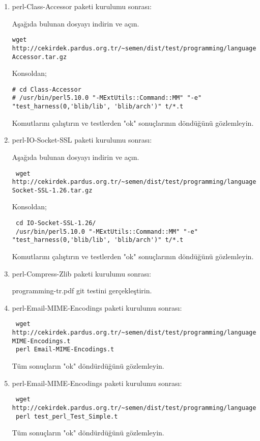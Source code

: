 \documentclass[a4paper,10pt]{article}
\begin{document}
\begin{enumerate}
\item perl-Class-Accessor paketi kurulumu sonrası:

Aşağıda bulunan dosyayı indirin ve açın.
\begin{verbatim}
wget http://cekirdek.pardus.org.tr/~semen/dist/test/programming/language/perl/Class-Accessor.tar.gz
\end{verbatim}

Konsoldan;
\begin{verbatim}
# cd Class-Accessor
# /usr/bin/perl5.10.0 "-MExtUtils::Command::MM" "-e" "test_harness(0,'blib/lib', 'blib/arch')" t/*.t
\end{verbatim}

Komutlarını çalıştırın ve testlerden "ok" sonuçlarının döndüğünü gözlemleyin.


\item perl-IO-Socket-SSL paketi kurulumu sonrası:

Aşağıda bulunan dosyayı indirin ve açın.
\begin{verbatim}
 wget http://cekirdek.pardus.org.tr/~semen/dist/test/programming/language/perl/IO-Socket-SSL-1.26.tar.gz
\end{verbatim}

Konsoldan;
\begin{verbatim}
 cd IO-Socket-SSL-1.26/
 /usr/bin/perl5.10.0 "-MExtUtils::Command::MM" "-e" "test_harness(0,'blib/lib', 'blib/arch')" t/*.t
\end{verbatim}

Komutlarını çalıştırın ve testlerden "ok" sonuçlarının döndüğünü gözlemleyin.
\item perl-Compress-Zlib paketi kurulumu sonrası:

programming-tr.pdf git testini gerçekleştirin.

\item perl-Email-MIME-Encodings paketi kurulumu sonrası:
\begin{verbatim}
 wget http://cekirdek.pardus.org.tr/~semen/dist/test/programming/language/perl/Email-MIME-Encodings.t
 perl Email-MIME-Encodings.t
\end{verbatim}

Tüm sonuçların "ok" döndürdüğünü gözlemleyin. 

\item perl-Email-MIME-Encodings paketi kurulumu sonrası:
\begin{verbatim}
 wget http://cekirdek.pardus.org.tr/~semen/dist/test/programming/language/perl/test_perl_Test_Simple.t
 perl test_perl_Test_Simple.t
\end{verbatim}

Tüm sonuçların "ok" döndürdüğünü gözlemleyin. 


\end{enumerate}
\end{document}
